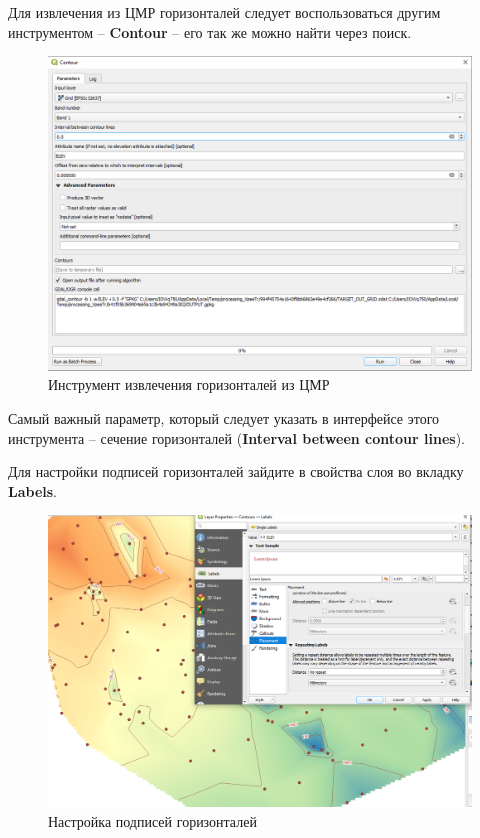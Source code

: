 \documentclass[
  12pt,
]{book}
\begin{document}
Для извлечения из ЦМР горизонталей следует воспользоваться другим инструментом -- \textbf{Contour} -- его так же можно найти через поиск.

\begin{figure}
\centering
\includegraphics{images/Practice/Contour.png}
\caption{Инструмент извлечения горизонталей из ЦМР}
\end{figure}

Самый важный параметр, который следует указать в интерфейсе этого инструмента -- сечение горизонталей (\textbf{Interval between contour lines}).

Для настройки подписей горизонталей зайдите в свойства слоя во вкладку \textbf{Labels}.

\begin{figure}
\centering
\includegraphics{images/Practice/Contours_Labels.png}
\caption{Настройка подписей горизонталей}
\end{figure}
\end{document}
